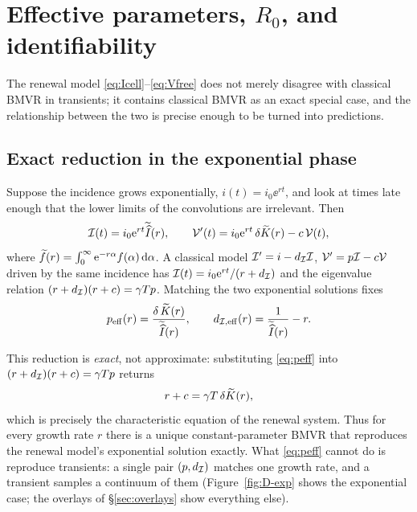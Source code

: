 
\section{Effective parameters, $R_0$, and identifiability}
\label{sec:peff-section}

The renewal model \eqref{eq:Icell}--\eqref{eq:Vfree} does not merely
disagree with classical BMVR in transients; it contains classical BMVR as an
exact special case, and the relationship between the two is precise enough
to be turned into predictions.

\subsection{Exact reduction in the exponential phase}

Suppose the incidence grows exponentially, $i(t)=i_0\ee^{rt}$, and look at
times late enough that the lower limits of the convolutions are irrelevant.
Then
\begin{equation}
\mathcal{I}(t)=i_0{\rm e}^{rt}\widetilde{\widehat{I}}(r),
\qquad
\mathcal{V}'(t)=i_0{\rm e}^{rt}\,\delta\widetilde{K}(r)-c\,\mathcal{V}(t),
\end{equation}
where $\widetilde{f}(r)=\int_0^\infty{\rm e}^{-r\alpha}f(\alpha)\,{\rm d}\alpha$. A
classical model $\mathcal{I}'=i-d_{\mathcal{I}}\mathcal{I}$, $\mathcal{V}'=p\mathcal{I}-c\mathcal{V}$
driven by the same incidence has $\mathcal{I}(t)=i_0{\rm e}^{rt}/(r+d_{\mathcal{I}})$ and
the eigenvalue relation $(r+d_{\mathcal{I}})(r+c)=\gamma Tp$. Matching the two
exponential solutions fixes
\begin{equation}
p_{\rm eff}(r)=\frac{\delta\,\widetilde{K}(r)}{\widetilde{\widehat{I}}(r)},
\qquad
d_{\mathcal{I},{\rm eff}}(r)=\frac{1}{\widetilde{\widehat{I}}(r)}-r.
\label{eq:peff}
\end{equation}

This reduction is \emph{exact}, not approximate: substituting
\eqref{eq:peff} into $(r+d_{\mathcal{I}})(r+c)=\gamma Tp$ returns
\begin{equation}
r+c=\gamma T\,\delta\widetilde{K}(r),
\label{eq:char}
\end{equation}
which is precisely the characteristic equation of the renewal system. Thus
for every growth rate $r$ there is a unique constant-parameter BMVR that
reproduces the renewal model's exponential solution exactly. What
\eqref{eq:peff} cannot do is reproduce transients: a single pair
$(p,d_{\mathcal{I}})$ matches one growth rate, and a transient samples a
continuum of them (Figure~\ref{fig:D-exp} shows the exponential case; the
overlays of \S\ref{sec:overlays} show everything else).

